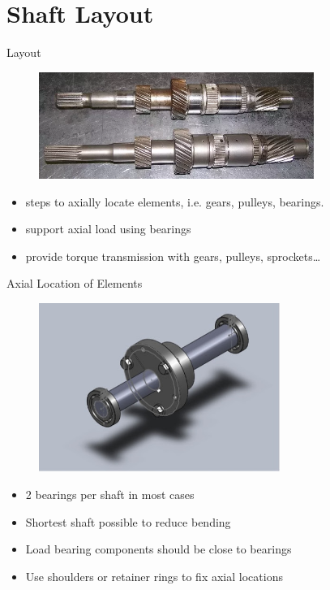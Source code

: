 \documentclass[10pt, svgnames]{beamer}
\begin{document}
\section{Shaft Layout}
\label{sec:orga131834}

\begin{frame}[label={sec:orga4b77e0}]{Layout}
\begin{figure}[htbp]
  \centering
  \includegraphics[width=0.8\textwidth]{Pictures/shaft-with-steps}
\end{figure}

\begin{itemize}
\item steps to axially locate elements, i.e. gears, pulleys, bearings.
\item support axial load using bearings
\item provide torque transmission with gears, pulleys, sprockets\ldots{}
\end{itemize}
\end{frame}

\begin{frame}[label={sec:orge667ad8}]{Axial Location of Elements}
\begin{figure}[htbp]
  \centering
  \includegraphics[width=0.7\textwidth]{Pictures/key-steps}
\end{figure}

\begin{itemize}
\item 2 bearings per shaft in most cases
\item Shortest shaft possible to reduce bending
\item Load bearing components should be close to bearings
\item Use shoulders or retainer rings to fix axial locations
\end{itemize}
\end{frame}
\end{document}
